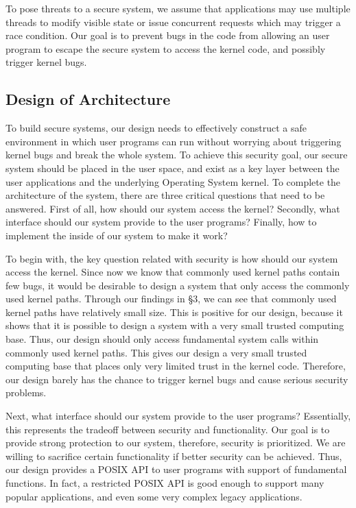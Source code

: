 To pose threats to a secure system, we assume that applications may use multiple threads to modify visible 
state or issue concurrent requests which may trigger a race condition. Our goal is to prevent bugs in 
the code from allowing an user program to escape the secure system to access the kernel code, and 
possibly trigger kernel bugs.

\subsection{Design of Architecture}
To build secure systems, our design needs to effectively construct a safe environment in which user programs 
can run without worrying about triggering kernel bugs and break the whole system. To achieve this security goal, 
our secure system should be placed in the user space, and exist as a key layer between the user applications 
and the underlying Operating System kernel. To complete the architecture of the system, there are three critical 
questions that need to be answered. First of all, how should our system access the kernel? Secondly, what interface 
should our system provide to the user programs? Finally, how to implement the inside of our system to make it work?

To begin with, the key question related with security is how should our system access the kernel. Since now we know 
that commonly used kernel paths contain few bugs, it would be desirable to design a system that only access the 
commonly used kernel paths. Through our findings in \S{3}, we can see that commonly used kernel paths have relatively 
small size. This is positive for our design, because it shows that it is possible to design a system with a very small 
trusted computing base. Thus, our design should only access fundamental system calls within commonly used kernel paths. 
This gives our design a very small trusted computing base that places only very limited trust in the kernel code. Therefore, 
our design barely has the chance to trigger kernel bugs and cause serious security problems. 

Next, what interface should our system provide to the user programs? Essentially, this represents the tradeoff between 
security and functionality. Our goal is to provide strong protection to our system, therefore, security is prioritized. We are willing 
to sacrifice certain functionality if better security can be achieved. Thus, our design provides a POSIX API to user programs with 
support of fundamental functions. In fact, a restricted POSIX API is good enough to support many popular applications, 
and even some very complex legacy applications. 

